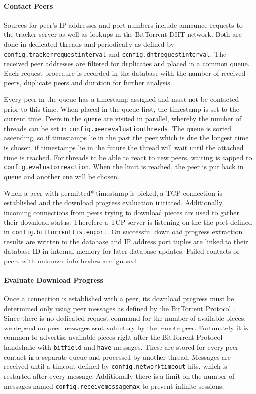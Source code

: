 \documentclass[10pt, a4paper, twoside, headsepline]{scrbook}
\renewcommand{\_}{\origunderscore\allowbreak}
\newcommand{\config}[1]{\texttt{config.\allowbreak #1}}
\begin{document}
\paragraph{Contact Peers}
Sources for peer's IP addresses and port numbers include announce requests to the tracker server as well as lookups in the BitTorrent DHT network. Both are done in dedicated threads and periodically as defined by \config{tracker\_request\_interval} and \config{dht\_request\_interval}. The received peer addresses are filtered for duplicates and placed in a common queue. Each request procedure is recorded in the database with the number of received peers, duplicate peers and duration for further analysis.

Every peer in the queue has a timestamp assigned and must not be contacted prior to this time. When placed in the queue first, the timestamp is set to the current time. Peers in the queue are visited in parallel, whereby the number of threads can be set in \config{peer\_evaluation\_threads}. The queue is sorted ascending, so if timestamps lie in the past the peer which is due the longest time is chosen, if timestamps lie in the future the thread will wait until the attached time is reached. For threads to be able to react to new peers, waiting is capped to \config{evaluator\_reaction}. When the limit is reached, the peer is put back in queue and another one will be chosen.

When a peer with permitted* timestamp is picked, a TCP connection is established and the download progress evaluation initiated. Additionally, incoming connections from peers trying to download pieces are used to gather their download status. Therefore a TCP server is listening on the the port defined in \config{bittorrent\_listen\_port}. On successful download progress extraction results are written to the database and IP address port tuples are linked to their database ID in internal memory for later database updates. Failed contacts or peers with unknown info hashes are ignored.

\paragraph{Evaluate Download Progress}
\label{peer-evaluation}
Once a connection is established with a peer, its download progress must be determined only using peer messages as defined by the BitTorrent Protocol \cite{bep3}. Since there is no dedicated request command for the number of available pieces, we depend on peer messages sent voluntary by the remote peer. Fortunately it is common to advertise available pieces right after the BitTorrent Protocol handshake with \texttt{bitfield} and \texttt{have} messages. These are stored for every peer contact in a separate queue and processed by another thread. Messages are received until a timeout defined by \config{network\_timeout} hits, which is restarted after every message. Additionally there is a limit on the number of messages named \config{receive\_message\_max} to prevent infinite sessions.
\end{document}
